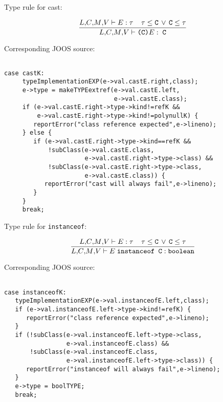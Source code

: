 \begin{slide*}

Type rule for cast:

$$ \frac{\mbox{$L$}{},\!\mbox{$C$}{},\!\mbox{$M$}{},\!\mbox{$V$}{} \vdash E: \tau\;\;\;\;
         \tau\leq\mbox{\tt C}\, \vee \,\mbox{\tt C}\leq\tau
        }{
         \mbox{$L$}{},\!\mbox{$C$}{},\!\mbox{$M$}{},\!\mbox{$V$}{} \vdash \mbox{\tt (C)}E:\; \mbox{\tt C}
        } $$

Corresponding JOOS source:
 
\begin{scriptsize}
\begin{verbatim}
 
case castK:
     typeImplementationEXP(e->val.castE.right,class);
     e->type = makeTYPEextref(e->val.castE.left,
                              e->val.castE.class);
     if (e->val.castE.right->type->kind!=refK &&
         e->val.castE.right->type->kind!=polynullK) {
        reportError("class reference expected",e->lineno);
     } else {
        if (e->val.castE.right->type->kind==refK &&
            !subClass(e->val.castE.class,
                      e->val.castE.right->type->class) &&
            !subClass(e->val.castE.right->type->class,
                      e->val.castE.class)) {
           reportError("cast will always fail",e->lineno);
        }
     }
     break;

\end{verbatim}
\end{scriptsize}


\vfil
\end{slide*}
 
\begin{slide*}
 
Type rule for {\tt instanceof}:

$$ \frac{\mbox{$L$}{},\!\mbox{$C$}{},\!\mbox{$M$}{},\!\mbox{$V$}{} \vdash E: \tau\;\;\;\;
         \tau\leq \mbox{\tt C}\, \vee \,\mbox{\tt C}\leq \tau}{
        \mbox{$L$}{},\!\mbox{$C$}{},\!\mbox{$M$}{},\!\mbox{$V$}{} \vdash E\; \mbox{\tt instanceof C}: \mbox{\tt
boolean}} $$

Corresponding JOOS source:
 
\begin{scriptsize}
\begin{verbatim}
 
case instanceofK:
   typeImplementationEXP(e->val.instanceofE.left,class);
   if (e->val.instanceofE.left->type->kind!=refK) {
      reportError("class reference expected",e->lineno);
   } 
   if (!subClass(e->val.instanceofE.left->type->class,
                 e->val.instanceofE.class) &&
       !subClass(e->val.instanceofE.class,
                 e->val.instanceofE.left->type->class)) {
      reportError("instanceof will always fail",e->lineno);
   }
   e->type = boolTYPE;
   break;

\end{verbatim}
\end{scriptsize}

\vfil
\end{slide*}

